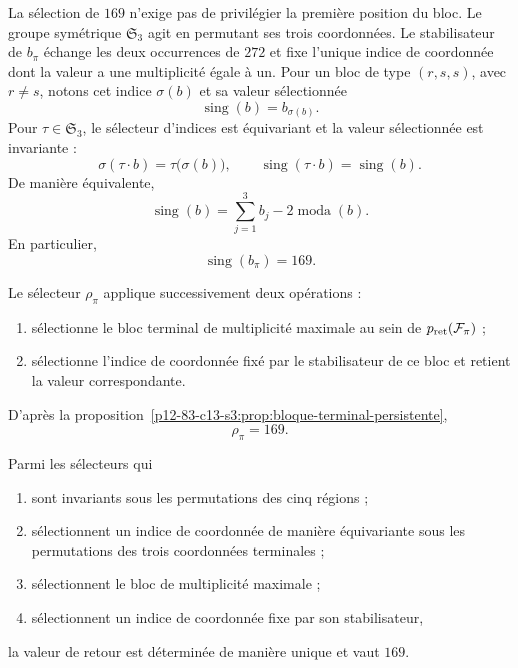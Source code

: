 La sélection de \(169\) n'exige pas de privilégier la première position du bloc.
Le groupe symétrique \(\mathfrak S_3\) agit en permutant ses trois coordonnées.
Le stabilisateur de \(b_\pi\) échange les deux occurrences de \(272\) et
fixe l'unique indice de coordonnée dont la valeur a une multiplicité égale à un.
Pour un bloc de type \((r,s,s)\), avec \(r\ne s\), notons cet indice
\(\sigma(b)\) et sa valeur sélectionnée
\[
 \operatorname{sing}(b)=b_{\sigma(b)}.
\]
Pour \(\tau\in\mathfrak S_3\), le sélecteur d'indices est équivariant et la valeur sélectionnée est invariante :
\[
 \sigma(\tau\cdot b)=\tau\bigl(\sigma(b)\bigr),\qquad
 \operatorname{sing}(\tau\cdot b)=\operatorname{sing}(b).
\]
De manière équivalente,
\[
\operatorname{sing}(b)
=\sum_{j=1}^3b_j-2\operatorname{moda}(b).
\]
En particulier,
\[
\boxed{\operatorname{sing}(b_\pi)=169.}
\]

\begin{definition}
\label{p12-83-c13-s3:def:selector-residual-pi}
Le sélecteur \(\rho_\pi\) applique successivement deux opérations :
\begin{enumerate}
  \item sélectionne le bloc terminal de multiplicité maximale au sein de \(p_{\rm ret}(\mathcal F_\pi)\) ;
  \item sélectionne l'indice de coordonnée fixé par le stabilisateur de
  ce bloc et retient la valeur correspondante.
\end{enumerate}
D'après la proposition~\ref{p12-83-c13-s3:prop:bloque-terminal-persistente},
\[
\boxed{\rho_\pi=169.}
\]
\end{definition}

\begin{theorem}
\label{p12-83-c13-s3:thm:unicidad-retorno-169}
Parmi les sélecteurs qui
\begin{enumerate}
  \item sont invariants sous les permutations des cinq régions ;
  \item sélectionnent un indice de coordonnée de manière équivariante sous les permutations des trois coordonnées terminales ;
  \item sélectionnent le bloc de multiplicité maximale ;
  \item sélectionnent un indice de coordonnée fixe par son stabilisateur,
\end{enumerate}
la valeur de retour est déterminée de manière unique et vaut \(169\).
\end{theorem}

